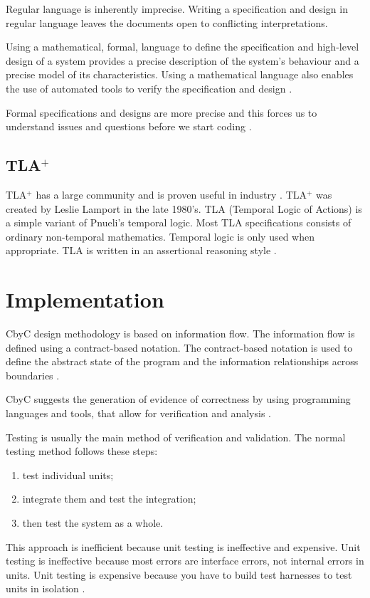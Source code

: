 Regular language is inherently imprecise. Writing a specification and design in 
regular language leaves the documents open to conflicting interpretations.

Using a mathematical, formal, language to define the specification and high-level
design of a system provides a precise description of the system's behaviour and
a precise model of its characteristics. Using a mathematical language also 
enables the use of automated tools to verify the specification and design \parencite{CbyCMan}.

Formal specifications and designs are more precise and this forces us to
understand issues and questions before we start coding \parencite{CbyCPraxis}.

\subsection{TLA\(^+\)}

TLA\(^+\) has a large community and is proven useful in industry 
\parencite{Industrial_Use_of_TLA}. TLA\(^+\) was created by Leslie Lamport in the
late 1980's. TLA (Temporal Logic of Actions) is a simple variant of Pnueli's 
temporal logic. Most TLA specifications consists of ordinary non-temporal 
mathematics. Temporal logic is only used when appropriate. TLA is written in an
assertional reasoning style \parencite{SpecifyingSystems}.

\section{Implementation}

CbyC design methodology is based on information flow. The information flow is
defined using a contract-based notation. The contract-based notation is
used to define the abstract state of the program and the information relationships
across boundaries \parencite{CbyCMan}. 

CbyC suggests the generation of evidence of correctness by using programming
languages and tools, that allow for verification and analysis \parencite{CbyCMan}.

Testing is usually the main method of verification and validation. The normal testing
method follows these steps:
\begin{enumerate}
	\item test individual units; 
	\item integrate them and test the integration; 
	\item then test the system as a whole. 
\end{enumerate}
This approach is inefficient because unit testing is ineffective and expensive. 
Unit testing is ineffective because most errors are interface errors, not internal
errors in units. Unit testing is expensive because you have to build test 
harnesses to test units in isolation \parencite{CbyCPraxis}.

